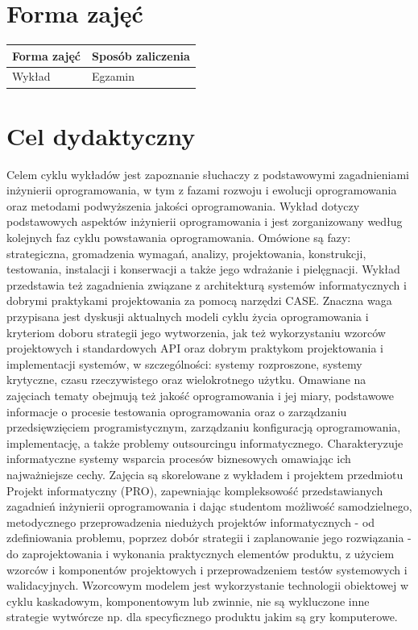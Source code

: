 \documentclass[12pt, a4paper]{article}
\begin{document}
\section{Forma zajęć}

\begin{tabular}{ll}
  \hline
  \textbf{Forma zajęć} & \textbf{Sposób zaliczenia} \\
  \hline
  Wykład & Egzamin \\
  \hline
\end{tabular}

\section{Cel dydaktyczny}

Celem cyklu wykładów jest zapoznanie słuchaczy z podstawowymi zagadnieniami inżynierii oprogramowania, w tym z fazami rozwoju i ewolucji oprogramowania oraz metodami podwyższenia jakości oprogramowania. Wykład dotyczy podstawowych aspektów inżynierii oprogramowania i jest zorganizowany według kolejnych faz cyklu powstawania oprogramowania. Omówione są fazy: strategiczna, gromadzenia wymagań, analizy, projektowania, konstrukcji, testowania, instalacji i konserwacji a także jego wdrażanie i pielęgnacji. Wykład przedstawia też zagadnienia związane z architekturą systemów informatycznych i dobrymi praktykami projektowania za pomocą narzędzi CASE. Znaczna waga przypisana jest dyskusji aktualnych modeli cyklu życia oprogramowania i kryteriom doboru strategii jego wytworzenia, jak też wykorzystaniu wzorców projektowych i standardowych API oraz dobrym praktykom projektowania i implementacji systemów, w szczególności: systemy rozproszone, systemy krytyczne, czasu rzeczywistego oraz wielokrotnego użytku. Omawiane na zajęciach tematy obejmują też jakość oprogramowania i jej miary, podstawowe informacje o procesie testowania oprogramowania oraz o zarządzaniu przedsięwzięciem programistycznym, zarządzaniu konfiguracją oprogramowania, implementację, a także problemy outsourcingu informatycznego. Charakteryzuje informatyczne systemy wsparcia procesów biznesowych omawiając ich najważniejsze cechy. Zajęcia są skorelowane z wykładem i projektem przedmiotu Projekt informatyczny (PRO), zapewniając kompleksowość przedstawianych zagadnień inżynierii oprogramowania i dając studentom możliwość samodzielnego, metodycznego przeprowadzenia niedużych projektów informatycznych - od zdefiniowania problemu, poprzez dobór strategii i zaplanowanie jego rozwiązania - do zaprojektowania i wykonania praktycznych elementów produktu, z użyciem wzorców i komponentów projektowych i przeprowadzeniem testów systemowych i walidacyjnych. Wzorcowym modelem jest wykorzystanie technologii obiektowej w cyklu kaskadowym, komponentowym lub zwinnie, nie są wykluczone inne strategie wytwórcze np. dla specyficznego produktu jakim są gry komputerowe.
\end{document}
